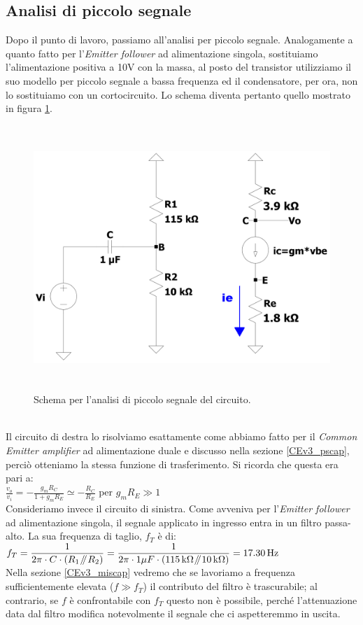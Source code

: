 \documentclass{report}
\newcommand{\parallelsum}{\mathbin{\!/\mkern-5mu/\!}}
\begin{document}
\subsection{Analisi di piccolo segnale}  
Dopo il punto di lavoro, passiamo all'analisi per piccolo segnale. Analogamente a quanto fatto per l'\textit{Emitter follower} ad alimentazione singola, sostituiamo l'alimentazione positiva a 10V con la massa, al posto del transistor utilizziamo il suo modello per piccolo segnale a bassa frequenza ed il condensatore, per ora, non lo sostituiamo con un cortocircuito. Lo schema diventa pertanto quello mostrato in figura \ref{figura:CEv3_ps}.
\begin{figure}[h]
\centering
\includegraphics[height=10cm]{immagini/CEv3_ps}
\caption{Schema per l'analisi di piccolo segnale del circuito.}
\label{figura:CEv3_ps}
\end{figure}
\\Il circuito di destra lo risolviamo esattamente come abbiamo fatto per il \textit{Common Emitter amplifier} ad alimentazione duale e discusso nella sezione \ref{CEv3_pscap}, perciò otteniamo la stessa funzione di trasferimento. Si ricorda che questa era pari a:
\\[2pt]\indent $\displaystyle{\frac{v_o}{v_i}=-\frac{g_mR_C}{1+g_mR_E}\simeq -\frac{R_C}{R_E}}$ per $g_mR_E\gg 1$
\\[2pt]Consideriamo invece il circuito di sinistra. Come avveniva per l'\textit{Emitter follower} ad alimentazione singola, il segnale applicato in ingresso entra in un filtro passa-alto. La sua frequenza di taglio, $f_T$ è di:
\\[2pt]\indent $\displaystyle{f_T=\frac{1}{2\pi\cdot C\cdot (R_1\parallelsum R_2)}=\frac{1}{2\pi\cdot 1\mu F\cdot(\SI{115}{k\ohm}\parallelsum\SI{10}{k\ohm})}=\SI{17.30}{\hertz}}$
\\[2pt]Nella sezione \ref{CEv3_miscap} vedremo che se lavoriamo a frequenza sufficientemente elevata ($f\gg f_T$) il contributo del filtro è trascurabile; al contrario, se $f$ è confrontabile con $f_T$ questo non è possibile, perché l'attenuazione data dal filtro modifica notevolmente il segnale che ci aspetteremmo in uscita. 
\end{document}
